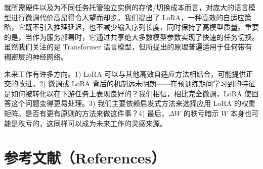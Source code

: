 \documentclass[11pt,UTF8,fontset=fandol]{ctexart}
\begin{document}
就所需硬件以及为不同任务托管独立实例的存储/切换成本而言，对庞大的语言模型进行微调代价高昂得令人望而却步。我们提出了 LoRA，一种高效的自适应策略，它既不引入推理延迟，也不减少输入序列长度，同时保持了高模型质量。重要的是，当作为服务部署时，它通过共享绝大多数模型参数实现了快速的任务切换。虽然我们关注的是 Transformer 语言模型，但所提出的原理普遍适用于任何带有稠密层的神经网络。

未来工作有许多方向。1) LoRA 可以与其他高效自适应方法相结合，可能提供正交的改进。2) 微调或 LoRA 背后的机制远未明朗——在预训练期间学习到的特征是如何被转化以在下游任务上表现良好的？我们相信，相比完全微调，LoRA 使回答这个问题变得更易处理。3) 我们主要依赖启发式方法来选择应用 LoRA 的权重矩阵。是否有更有原则的方法来做这件事？4) 最后，$\Delta W$ 的秩亏暗示 $W$ 本身也可能是秩亏的，这同样可以成为未来工作的灵感来源。

\section*{参考文献（References）}
\end{document}
